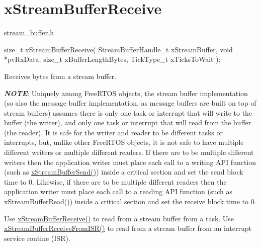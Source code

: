 \hypertarget{group__x_stream_buffer_receive}{}\section{x\+Stream\+Buffer\+Receive}
\label{group__x_stream_buffer_receive}
\hyperlink{stream__buffer_8h}{stream\+\_\+buffer.\+h}


\begin{DoxyPre}
size\_t xStreamBufferReceive( StreamBufferHandle\_t xStreamBuffer,
                             void *pvRxData,
                             size\_t xBufferLengthBytes,
                             TickType\_t xTicksToWait );
\end{DoxyPre}


Receives bytes from a stream buffer.

{\itshape {\bfseries N\+O\+TE}}\+: Uniquely among Free\+R\+T\+OS objects, the stream buffer implementation (so also the message buffer implementation, as message buffers are built on top of stream buffers) assumes there is only one task or interrupt that will write to the buffer (the writer), and only one task or interrupt that will read from the buffer (the reader). It is safe for the writer and reader to be different tasks or interrupts, but, unlike other Free\+R\+T\+OS objects, it is not safe to have multiple different writers or multiple different readers. If there are to be multiple different writers then the application writer must place each call to a writing A\+PI function (such as \hyperlink{stream__buffer_8h_a35cdf3b6bf677086b9128782f762499d}{x\+Stream\+Buffer\+Send()}) inside a critical section and set the send block time to 0. Likewise, if there are to be multiple different readers then the application writer must place each call to a reading A\+PI function (such as x\+Stream\+Buffer\+Read()) inside a critical section and set the receive block time to 0.

Use \hyperlink{stream__buffer_8h_a55efc144b988598d84a6087d3e20b507}{x\+Stream\+Buffer\+Receive()} to read from a stream buffer from a task. Use \hyperlink{stream__buffer_8h_a6c882a1d9f26c40f93f271bd1b844b3b}{x\+Stream\+Buffer\+Receive\+From\+I\+S\+R()} to read from a stream buffer from an interrupt service routine (I\+SR).


